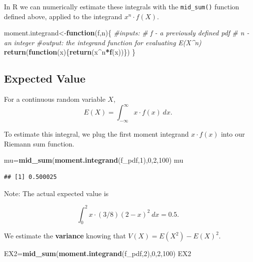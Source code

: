 \documentclass[
]{book}
\newenvironment{Shaded}{\begin{snugshade}}{\end{snugshade}}
\newcommand{\CommentTok}[1]{\textcolor[rgb]{0.56,0.35,0.01}{\textit{#1}}}
\newcommand{\ControlFlowTok}[1]{\textcolor[rgb]{0.13,0.29,0.53}{\textbf{#1}}}
\newcommand{\DecValTok}[1]{\textcolor[rgb]{0.00,0.00,0.81}{#1}}
\newcommand{\FunctionTok}[1]{\textcolor[rgb]{0.13,0.29,0.53}{\textbf{#1}}}
\newcommand{\NormalTok}[1]{#1}
\newcommand{\OtherTok}[1]{\textcolor[rgb]{0.56,0.35,0.01}{#1}}
\newcommand{\SpecialCharTok}[1]{\textcolor[rgb]{0.81,0.36,0.00}{\textbf{#1}}}
\theoremstyle{definition}
\theoremstyle{definition}
\theoremstyle{definition}
\theoremstyle{definition}
\theoremstyle{remark}
\begin{document}
In R we can numerically estimate these integrals with the \texttt{mid\_sum()} function defined above, applied to the integrand \(x^n\cdot f(X)\).

\begin{Shaded}
\begin{Highlighting}[]
\NormalTok{moment.integrand}\OtherTok{\textless{}{-}}\ControlFlowTok{function}\NormalTok{(f,n)\{}
  \CommentTok{\#inputs:}
      \CommentTok{\# f {-} a previously defined pdf}
      \CommentTok{\# n {-} an integer}
  \CommentTok{\#output: the integrand function for evaluating E(X\^{}n)}
  \FunctionTok{return}\NormalTok{(}\ControlFlowTok{function}\NormalTok{(x)\{}\FunctionTok{return}\NormalTok{(x}\SpecialCharTok{\^{}}\NormalTok{n}\SpecialCharTok{*}\FunctionTok{f}\NormalTok{(x))\})}
\NormalTok{\}}
\end{Highlighting}
\end{Shaded}

\subsection*{Expected Value}\label{expected-value-1}

For a continuous random variable \(X\), \[E(X)=\int_{-\infty}^{\infty} x \cdot f(x)~dx.\]

To estimate this integral, we plug the first moment integrand \(x \cdot f(x)\) into our Riemann sum function.

\begin{Shaded}
\begin{Highlighting}[]
\NormalTok{mu}\OtherTok{=}\FunctionTok{mid\_sum}\NormalTok{(}\FunctionTok{moment.integrand}\NormalTok{(f\_pdf,}\DecValTok{1}\NormalTok{),}\DecValTok{0}\NormalTok{,}\DecValTok{2}\NormalTok{,}\DecValTok{100}\NormalTok{)}
\NormalTok{mu}
\end{Highlighting}
\end{Shaded}

\begin{verbatim}
## [1] 0.500025
\end{verbatim}

Note: The actual expected value is

\[\int_0^2 x \cdot (3/8)(2-x)^2~dx = 0.5.\]

We estimate the \textbf{variance} knowing that \(V(X) = E(X^2)-E(X)^2.\)

\begin{Shaded}
\begin{Highlighting}[]
\NormalTok{EX2}\OtherTok{=}\FunctionTok{mid\_sum}\NormalTok{(}\FunctionTok{moment.integrand}\NormalTok{(f\_pdf,}\DecValTok{2}\NormalTok{),}\DecValTok{0}\NormalTok{,}\DecValTok{2}\NormalTok{,}\DecValTok{100}\NormalTok{)}
\NormalTok{EX2}
\end{Highlighting}
\end{Shaded}
\end{document}

